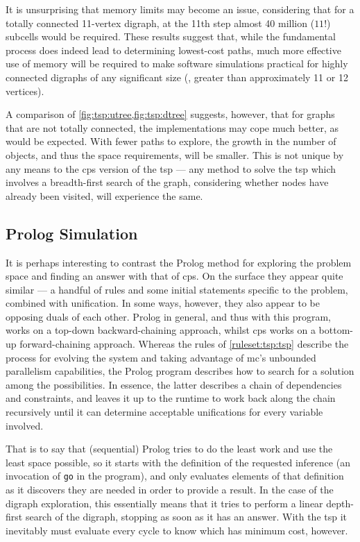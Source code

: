 It is unsurprising that memory limits may become an issue, considering that for a totally connected 11-vertex digraph, at the 11th step almost 40 million (\(11!\)) subcells would be required.  These results suggest that, while the fundamental process does indeed lead to determining lowest-cost paths, much more effective use of memory will be required to make software simulations practical for highly connected digraphs of any significant size (\ie{}, greater than approximately 11 or 12 vertices).

A comparison of \cref{fig:tsp:utree,fig:tsp:dtree} suggests, however, that for graphs that are not totally connected, the implementations may cope much better, as would be expected.  With fewer paths to explore, the growth in the number of objects, and thus the space requirements, will be smaller.  This is not unique by any means to the \gls{cps} version of the \gls{tsp} --- any method to solve the \gls{tsp} which involves a breadth-first search of the graph, considering whether nodes have already been visited, will experience the same. 

\subsection{Prolog Simulation}

It is perhaps interesting to contrast the Prolog method for exploring the problem space and finding an answer with that of \gls{cps}.  On the surface they appear quite similar --- a handful of rules and some initial statements specific to the problem, combined with unification.   In some ways, however, they also appear to be opposing duals of each other.  Prolog in general, and thus with this program, works on a top-down backward-chaining approach, whilst \gls{cps} works on a bottom-up forward-chaining approach.  Whereas the rules of \cref{ruleset:tsp:tsp} describe the process for evolving the system  and taking advantage of \gls{mc}'s unbounded parallelism capabilities, the Prolog program describes how to search for a solution among the possibilities.  In essence, the latter describes a chain of dependencies and constraints, and leaves it up to the runtime to work back along the chain recursively until it can determine acceptable unifications for every variable involved.

That is to say that (sequential) Prolog tries to do the least work and use the least space possible, so it starts with the definition of the requested inference (an invocation of \texttt{go} in the program), and only evaluates elements of that definition as it discovers they are needed in order to provide a result.  In the case of the digraph exploration, this essentially means that it tries to perform a linear depth-first search of the digraph, stopping as soon as it has an answer.  With the \gls{tsp} it inevitably must evaluate every cycle to know which has minimum cost, however.

